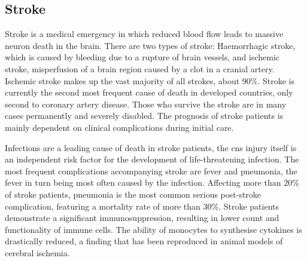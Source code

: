 
\subsection{Stroke} \label{sec:intro:stroke}
Stroke is a medical emergency in which reduced blood flow leads to massive neuron death in the brain. There are two types of stroke: Haemorrhagic stroke, which is caused by bleeding due to a rupture of brain vessels, and ischemic stroke, misperfusion of a brain region caused by a clot in a cranial artery. Ischemic stroke makes up the vast majority of all strokes, about 90\%. Stroke is currently the second most frequent cause of death in developed countries, only second to coronary artery disease. Those who survive the stroke are in many cases permanently and severely disabled. The prognosis of stroke patients is mainly dependent on clinical complications during initial care.

Infections are a leading cause of death in stroke patients, the \ac{cns} injury itself is an independent risk factor for the development of life-threatening infection. The most frequent complications accompanying stroke are fever and pneumonia, the fever in turn being most often caused by the infection. Affecting more than 20\% of stroke patients, pneumonia is the most common serious post-stroke complication, featuring a mortality rate of more than 30\%.\cite{Meisel2005} Stroke patients demonstrate a significant immunosuppression, resulting in lower count and functionality of immune cells. The ability of monocytes to synthesise cytokines is drastically reduced, a finding that has been reproduced in animal models of cerebral ischemia.

